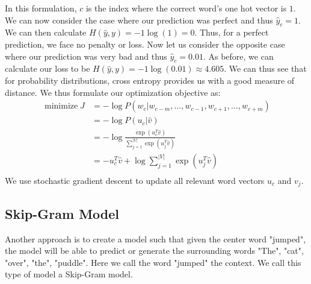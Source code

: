 \documentclass[nobib]{tufte-handout}
\begin{document}
In this formulation, $c$ is the index where the correct word's one hot vector is $1$. We can now consider the case where our prediction was perfect and thus $\hat{y}_c = 1$. We can then calculate $H(\hat{y},y) = -1\log(1) = 0$. Thus, for a perfect prediction, we face no penalty or loss. Now let us consider the opposite case where our prediction was very bad and thus $\hat{y}_c = 0.01$. As before, we can calculate our loss to be $H(\hat{y},y) = -1\log(0.01) \approx 4.605$. We can thus see that for probability distributions, cross entropy provides us with a good measure of distance. We thus formulate our optimization objective as:
\begin{align*}
\operatorname{minimize} J &= -\log P(w_{c}|w_{c-m}, \hdots, w_{c-1}, w_{c+1}, \hdots, w_{c+m})\\
&= -\log P(u_{c}|\hat{v})\\
&= -\log \frac{\exp(u_{c}^{T}\hat{v})}{\sum_{j=1}^{|V|}\exp(u_{j}^{T}\hat{v})}\\
&= -u_{c}^{T}\hat{v}+\log \sum_{j=1}^{|V|}\exp(u_{j}^{T}\hat{v})\\
\end{align*}
We use stochastic gradient descent to update all relevant word vectors $u_{c}$ and $v_{j}$.\\



\subsection{Skip-Gram Model}



Another approach is to create a model such that given the center word "jumped", the model will be able to predict or generate the surrounding words "The", "cat", "over", "the", "puddle". Here we call the word "jumped" the context. We call this type of model a Skip-Gram model.
\end{document}
